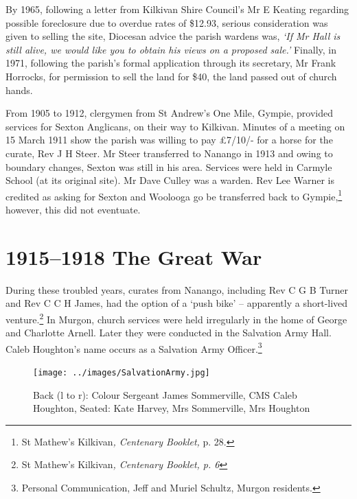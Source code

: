 By 1965, following a letter from Kilkivan Shire Council's Mr E Keating regarding possible foreclosure due to overdue rates of \$12.93, serious consideration was given to selling the site, Diocesan advice the parish wardens was, \emph{`If Mr Hall is still alive, we would like you to obtain his views on a proposed sale.'} Finally, in 1971, following the parish's formal application through its secretary, Mr Frank Horrocks, for permission to sell the land for \$40, the land passed out of church hands.



From 1905 to 1912, clergymen from St Andrew's One Mile, Gympie, provided services for Sexton Anglicans, on their way to Kilkivan. Minutes of a meeting on 15 March 1911 show the parish was willing to pay \pounds7/10/- for a horse for the curate, Rev J H Steer. Mr Steer transferred to Nanango in 1913 and owing to boundary changes, Sexton was still in his area. Services were held in Carmyle School (at its original site). Mr Dave Culley was a warden. Rev Lee Warner is credited as asking for Sexton and Woolooga go be transferred back to Gympie,\footnote{St Mathew's Kilkivan\emph{, Centenary Booklet,} p. 28.} however, this did not eventuate.


\section{1915--1918 The Great War}



During these troubled years, curates from Nanango, including Rev C G B Turner and Rev C C H James, had the option of a `push bike' -- apparently a short-lived venture.\footnote{St Mathew's Kilkivan\emph{, Centenary Booklet, p. 6}} In Murgon, church services were held irregularly in the home of George and Charlotte Arnell. Later they were conducted in the Salvation Army Hall. Caleb Houghton's name occurs as a Salvation Army Officer.\footnote{Personal Communication, Jeff and Muriel Schultz, Murgon residents.}








\begin{figure}
\begin{center}
\texttt{[image: ../images/SalvationArmy.jpg]}
\caption{Back (l to r): Colour Sergeant James Sommerville, CMS Caleb Houghton, Seated: Kate Harvey, Mrs Sommerville, Mrs Houghton}
\end{center}
\end{figure}




